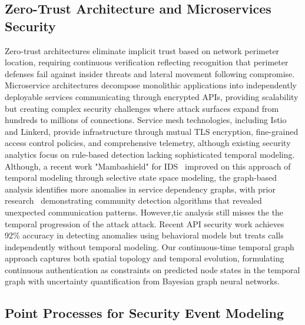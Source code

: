 \documentclass[lettersize,journal]{IEEEtran}
\begin{document}
\subsection{Zero-Trust Architecture and Microservices Security}

Zero-trust architectures eliminate implicit trust based on network perimeter location, requiring continuous verification reflecting recognition that perimeter defenses fail against insider threats and lateral movement following compromise. Microservice architectures decompose monolithic applications into independently deployable services communicating through encrypted APIs, providing scalability but creating complex security challenges where attack surfaces expand from hundreds to millions of connections. Service mesh technologies, including Istio and Linkerd, provide infrastructure through mutual TLS encryption, fine-grained access control policies, and comprehensive telemetry, although existing security analytics focus on rule-based detection lacking sophisticated temporal modeling. Although, a recent work "Mambashield" for IDS~\cite{aandtb2026} improved on this approach of temporal modeling through selective state space modeling, the graph-based analysis identifies more anomalies in service dependency graphs, with prior research~\cite{jiang2019graph} demonstrating community detection algorithms that revealed unexpected communication patterns. However,tic analysis still misses the the temporal progression of the attack attack. Recent API security work achieves 92\% accuracy in detecting anomalies using behavioral models but treats calls independently without temporal modeling. Our continuous-time temporal graph approach captures both spatial topology and temporal evolution, formulating continuous authentication as constraints on predicted node states in the temporal graph with uncertainty quantification from Bayesian graph neural networks.

\subsection{Point Processes for Security Event Modeling}
\end{document}
